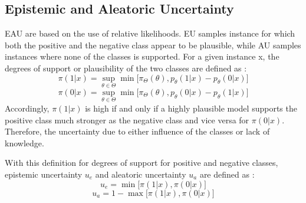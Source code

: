 \subsection{Epistemic and Aleatoric Uncertainty}
\label{subsec:epistemic_and_alreatoric_uncertainty}

\ac{EAU} are based on the use of relative likelihoods. 
\ac{EU} samples instance for which both the positive and the negative class appear to be plausible, while \ac{AU} samples instances where none of the classes is supported.
For a given instance x, the degrees of support or plausibility of the two classes are defined as \cite{nguyen2021howtomeasure}:
\begin{equation}
\pi(1 | x) = \sup_{\theta \in \Theta} \min \bigg[ \pi_{\Theta}(\theta), p_{\theta}(1 | x) - p_{\theta}(0 | x)\bigg]
\end{equation} 
\begin{equation}
\pi(0 | x) = \sup_{\theta \in \Theta} \min \bigg[ \pi_{\Theta}(\theta), p_{\theta}(0 | x) - p_{\theta}(1 | x)\bigg]
\end{equation} 
Accordingly, $\pi(1 | x)$ is high if and only if a highly plausible model supports the positive class much stronger as the negative class and vice versa for $\pi(0 | x)$.
Therefore, the uncertainty due to either influence of the classes or lack of knowledge. 

With this definition for degrees of support for positive and negative classes, epistemic uncertainty $u_e$ and aleatoric uncertainty $u_a$ are defined as \cite{nguyen2021howtomeasure}:
\begin{equation}
u_e = \min \bigg[ \pi(1 | x), \pi(0 | x) \bigg]
\end{equation}
\begin{equation}
u_a = 1 - \max \bigg[ \pi(1 | x), \pi(0 | x) \bigg]
\end{equation}

